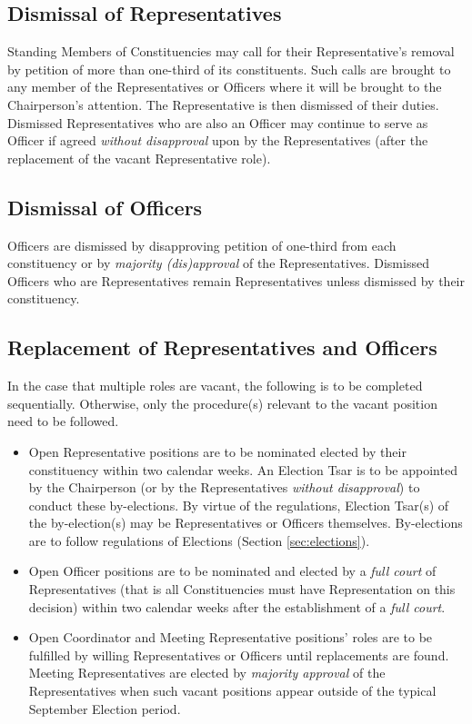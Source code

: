 \documentclass[8pt]{article}
\begin{document}
	\subsection{Dismissal of Representatives} Standing Members of Constituencies may call for their Representative's removal by petition of more than one-third of its constituents. Such calls are brought to any member of the Representatives or Officers where it will be brought to the Chairperson's attention. The Representative is then dismissed of their duties. Dismissed Representatives who are also an Officer may continue to serve as Officer if agreed \textit{without disapproval} upon by the Representatives (after the replacement of the vacant Representative role).
	\subsection{Dismissal of Officers} Officers are dismissed by disapproving petition of one-third from each constituency or by \textit{majority (dis)approval} of the Representatives. Dismissed Officers who are Representatives remain Representatives unless dismissed by their constituency.
	\subsection{Replacement of Representatives and Officers}
	In the case that multiple roles are vacant, the following is to be completed sequentially. Otherwise, only the procedure(s) relevant to the vacant position need to be followed. 
	\begin{itemize}
		\item Open Representative positions are to be nominated elected by their constituency within two calendar weeks. An Election Tsar is to be appointed by the Chairperson (or by the Representatives \textit{without disapproval}) to conduct these by-elections. By virtue of the regulations, Election Tsar(s) of the by-election(s) may be Representatives or Officers themselves. By-elections are to follow regulations of Elections (Section \ref{sec:elections}).
		\item Open Officer positions are to be nominated and elected by a \textit{full court} of Representatives (that is all Constituencies must have Representation on this decision) within two calendar weeks after the establishment of a \textit{full court}.
		\item Open Coordinator and Meeting Representative positions' roles are to be fulfilled by willing Representatives or Officers until replacements are found. Meeting Representatives are elected by \textit{majority approval} of the Representatives when such vacant positions appear outside of the typical September Election period.
	\end{itemize}
\end{document}
